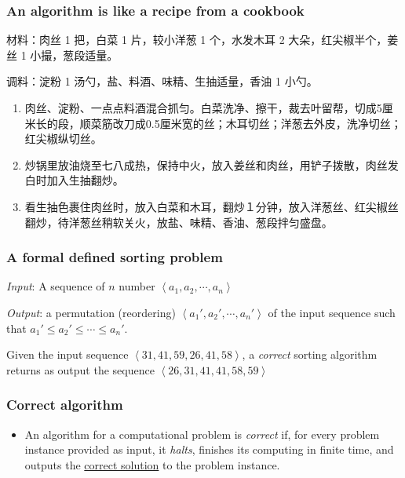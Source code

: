 \begin{frame}
    \frametitle{An algorithm is like a recipe from a cookbook}

    材料：肉丝 1 把，白菜 1 片，较小洋葱 1 个，水发木耳 2 大朵，红尖椒半个，姜丝 1 小撮，葱段适量。

    调料：淀粉 1 汤勺，盐、料酒、味精、生抽适量，香油 1 小勺。
    \begin{enumerate}
        \item 肉丝、淀粉、一点点料酒混合抓匀。白菜洗净、擦干，裁去叶留帮，切成5厘米长的段，顺菜筋改刀成0.5厘米宽的丝；木耳切丝；洋葱去外皮，洗净切丝；红尖椒纵切丝。
        \item 炒锅里放油烧至七八成热，保持中火，放入姜丝和肉丝，用铲子拨散，肉丝发白时加入生抽翻炒。
        \item 看生抽色裹住肉丝时，放入白菜和木耳，翻炒１分钟，放入洋葱丝、红尖椒丝翻炒，待洋葱丝稍软关火，放盐、味精、香油、葱段拌匀盛盘。
    \end{enumerate}

\end{frame}

\begin{frame}
    \frametitle{A formal defined sorting problem}

    \emph{Input}: A sequence of $n$ number $\left\langle a_1, a_2, \cdots, a_n \right\rangle$

    \emph{Output}: a permutation (reordering) $\left\langle a_1', a_2', \cdots, a_n'\right\rangle$ of the input sequence such that $a_1' \leqslant a_2'\leqslant \cdots \leqslant a_n'$.

    \pause
    \vspace{\baselineskip}

    Given the input sequence $\left\langle 31, 41, 59, 26, 41, 58 \right\rangle$, a \emph{correct} sorting algorithm returns as output the sequence $\left\langle 26, 31, 41, 41, 58, 59 \right\rangle$

\end{frame}

\begin{frame}
    \frametitle{Correct algorithm}

    \begin{itemize}
        \item An algorithm for a computational problem is \emph{correct} if, for every problem instance provided as input, it \emph{halts}, finishes its computing in finite time, and outputs the \underline{correct solution} to the problem instance.
    \end{itemize}

\end{frame}

